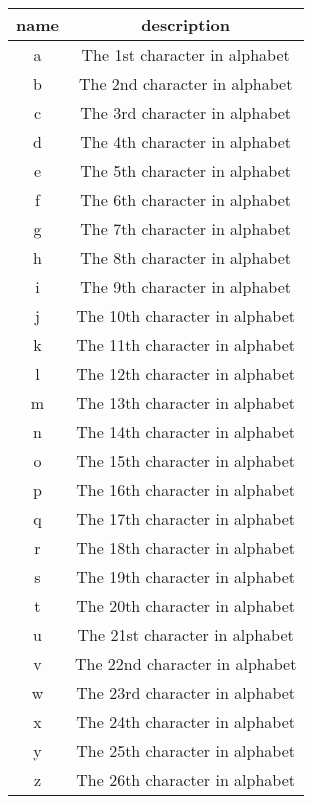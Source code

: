 \begin{center}
    \tablefirsthead{\hline}
    \begin{xtabular}{|c|c|}     %
        name & description \\ \hline
        a & The 1st character in alphabet \\
        b & The 2nd character in alphabet \\
        c & The 3rd character in alphabet \\
        d & The 4th character in alphabet \\
        e & The 5th character in alphabet \\
        f & The 6th character in alphabet \\
        g & The 7th character in alphabet \\
        h & The 8th character in alphabet \\
        i & The 9th character in alphabet \\
        j & The 10th character in alphabet \\
        k & The 11th character in alphabet \\
        l & The 12th character in alphabet \\
        m & The 13th character in alphabet \\
        n & The 14th character in alphabet \\
        o & The 15th character in alphabet \\
        p & The 16th character in alphabet \\
        q & The 17th character in alphabet \\
        r & The 18th character in alphabet \\
        s & The 19th character in alphabet \\
        t & The 20th character in alphabet \\
        u & The 21st character in alphabet \\
        v & The 22nd character in alphabet \\
        w & The 23rd character in alphabet \\
        x & The 24th character in alphabet \\
        y & The 25th character in alphabet \\
        z & The 26th character in alphabet \\
    \end{xtabular}
\end{center}


